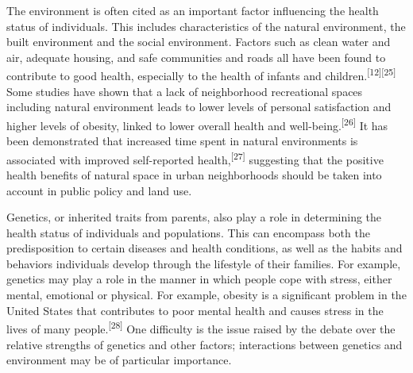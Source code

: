 The environment is often cited as an important factor influencing the health status of individuals. This includes characteristics of the natural environment, the built environment and the social environment. Factors such as clean water and air, adequate housing, and safe communities and roads all have been found to contribute to good health, especially to the health of infants and children.\textsuperscript{[12]}\textsuperscript{[25]} Some studies have shown that a lack of neighborhood recreational spaces including natural environment leads to lower levels of personal satisfaction and higher levels of obesity, linked to lower overall health and well-being.\textsuperscript{[26]} It has been demonstrated that increased time spent in natural environments is associated with improved self-reported health,\textsuperscript{[27]} suggesting that the positive health benefits of natural space in urban neighborhoods should be taken into account in public policy and land use.

Genetics, or inherited traits from parents, also play a role in determining the health status of individuals and populations. This can encompass both the predisposition to certain diseases and health conditions, as well as the habits and behaviors individuals develop through the lifestyle of their families. For example, genetics may play a role in the manner in which people cope with stress, either mental, emotional or physical. For example, obesity is a significant problem in the United States that contributes to poor mental health and causes stress in the lives of many people.\textsuperscript{[28]} One difficulty is the issue raised by the debate over the relative strengths of genetics and other factors; interactions between genetics and environment may be of particular importance.

